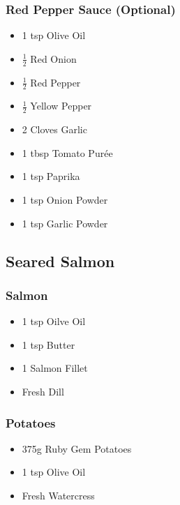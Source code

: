 \documentclass[11pt, english]{article}
\begin{document}
		\subsubsection*{Red Pepper Sauce (Optional)}
		
	\begin{itemize}
        \setlength\itemsep{0cm}
                \item 1 tsp Olive Oil
		\item $\frac{1}{2}$ Red Onion
		\item $\frac{1}{2}$ Red Pepper
		\item $\frac{1}{2}$ Yellow Pepper
		\item 2 Cloves Garlic
		\item 1 tbsp Tomato Pur\'{e}e
		\item 1 tsp Paprika
		\item 1 tsp Onion Powder 
		\item 1 tsp Garlic Powder
        \end{itemize}

\newpage

	\subsection{Seared Salmon}

		\subsubsection*{Salmon}

	\begin{itemize}
        \setlength\itemsep{0cm}
                \item 1 tsp Oilve Oil
		\item 1 tsp Butter
		\item 1 Salmon Fillet
		\item Fresh Dill
        \end{itemize}

		\subsubsection*{Potatoes}

	\begin{itemize}
        \setlength\itemsep{0cm}
                \item 375g Ruby Gem Potatoes
		\item 1 tsp Olive Oil
		\item Fresh Watercress
        \end{itemize}
\end{document}
